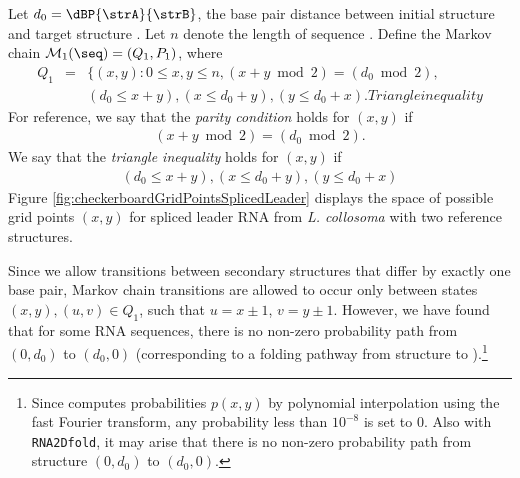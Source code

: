 \begin{description}
Let $d_0= \dBP{\strA}{\strB}$, the base pair distance between initial structure
\strA and target structure \strB.  Let $n$ denote the length of sequence \seq.
Define the Markov chain $\mathcal{M}_1(\seq) = (Q_1,P_1)$, where
\begin{align}
\label{eq:defQ1} Q_1 &=& \{ (x,y) : 0 \leq x,y \leq n, (x+y \bmod 2)
= (d_0 \bmod 2), \\ %
& & (d_0 \leq x+y), (x \leq d_0 + y), (y \leq d_0 + x). \nonumber %
Triangle inequality
\end{align}
For reference, we say that the {\em parity condition} holds for
$(x,y)$ if
\begin{align}
\label{eq:parityCondition} (x+y \bmod 2) = (d_0 \bmod 2).
\end{align}
We say that the {\em triangle inequality} holds for $(x,y)$ if
\begin{align}
\label{eq:triangleInequality} (d_0 \leq x+y), (x \leq d_0 + y), (y
\leq d_0 + x)
\end{align}
Figure \ref{fig:checkerboardGridPointsSplicedLeader} displays the
space of possible grid points $(x,y)$ for spliced leader RNA from {\em
L. collosoma} with two reference structures.

Since we allow transitions between secondary structures that differ by
exactly one base pair, Markov chain transitions are allowed to occur
only between states $(x,y),(u,v) \in Q_1$, such that $u=x\pm 1$, $v =
y \pm 1$. However, we have found that for some RNA sequences, there is
no non-zero probability path from $(0,d_0)$ to $(d_0,0)$
(corresponding to a folding pathway from structure \strA to
\strB).\footnote{Since \ffttwo computes probabilities $p(x,y)$ by
polynomial interpolation using the fast Fourier transform, any
probability less than $10^{-8}$ is set to $0$. Also with {\tt
RNA2Dfold}, it may arise that there is no non-zero probability path
from structure $(0,d_0)$ to $(d_0,0)$.}


\end{description}
